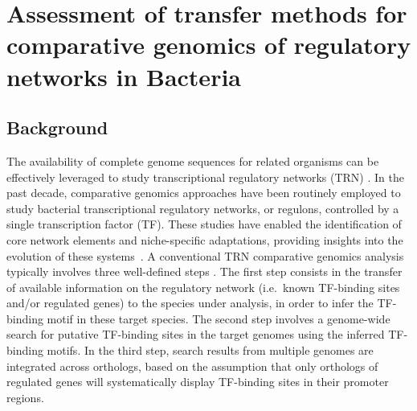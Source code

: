 
\chapter{Assessment of transfer methods for comparative genomics of regulatory
  networks in Bacteria}

\section{Background}

The availability of complete genome sequences for related organisms can be
effectively leveraged to study transcriptional regulatory networks (TRN)
\cite{babu2008computational}. In the past decade, comparative genomics
approaches have been routinely employed to study bacterial transcriptional
regulatory networks, or regulons, controlled by a single transcription factor
(TF). These studies have enabled the identification of core network elements
and niche-specific adaptations, providing insights into the evolution of these
systems~\cite{tan2001comparative, makarova2001conservation,
  erill2004differences, venancio2009reconstructing, baumbach2010power,
  rodionov2013transcriptional}. A conventional TRN comparative genomics
analysis typically involves three well-defined steps
\cite{babu2008computational, gelfand2000comparative, baumbach2009reliable}. The
first step consists in the transfer of available information on the regulatory
network (i.e.\ known TF-binding sites and/or regulated genes) to the species
under analysis, in order to infer the TF-binding motif in these target
species. The second step involves a genome-wide search for putative TF-binding
sites in the target genomes using the inferred TF-binding motifs. In the third
step, search results from multiple genomes are integrated across orthologs,
based on the assumption that only orthologs of regulated genes will
systematically display TF-binding sites in their promoter regions.

